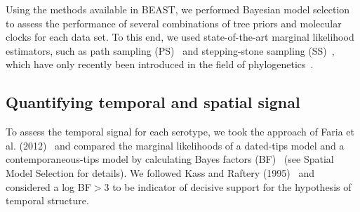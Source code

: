 \documentclass[10pt]{article}
\begin{document}
Using the methods available in BEAST, we performed Bayesian model selection to assess the performance of several combinations of tree priors and molecular clocks for each data set.
To this end, we used state-of-the-art marginal likelihood estimators, such as path sampling (PS)~\cite{LartillotPhilippe} and stepping-stone sampling (SS)~\cite{Xie}, which have only recently been introduced in the field of phylogenetics~\cite{LartillotPhilippe, Xie, Baele2012, Baele2013a, Baele2013b}.

\subsection*{Quantifying temporal and spatial signal} 

To assess the temporal signal for each serotype, we took the approach of Faria et al. (2012)~\cite{Faria2012} and compared the marginal likelihoods of a dated-tips model and a contemporaneous-tips model by calculating Bayes factors (BF)~\cite{Suchard2001,suchard2005models} (see Spatial Model Selection for details).
We followed Kass and Raftery (1995)~\cite{KassRaftery1995} and considered a log BF$>$3 to be indicator of decisive support for the hypothesis of temporal structure.
\end{document}
